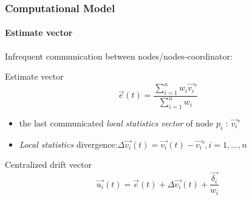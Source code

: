 \documentclass[hyperref={pdfpagelabels=false}]{beamer}
\begin{document}
\begin{frame} \frametitle{Computational Model}\framesubtitle{Estimate vector}
Infrequent communication between nodes/nodes-coordinator:
\begin{block}{Estimate vector}
\begin{equation*}
\vec{e}(t)=\frac{\sum_{i=1}^n {w_i \vec{v_i}'}}{\sum_{i=1}^n {w_i}}
\end{equation*}
\end{block}
\begin{itemize}
\item the last communicated \emph{local statistics vector} of node $p_i$ : $\vec{v_i}'$
\item \emph{Local statistics} divergence:$\Delta \vec{v_i}(t)=\vec{v_i}(t)-\vec{v_i}', i=1,\dots,n$
\end{itemize}
\begin{block}{Centralized drift vector}
\begin{equation*}
\vec{u_i}(t)=\vec{e}(t)+\Delta \vec{v_i}(t)+\frac{\vec{\delta_i}}{w_i}
\end{equation*} 
\end{block}
\end{frame}
\end{document}
